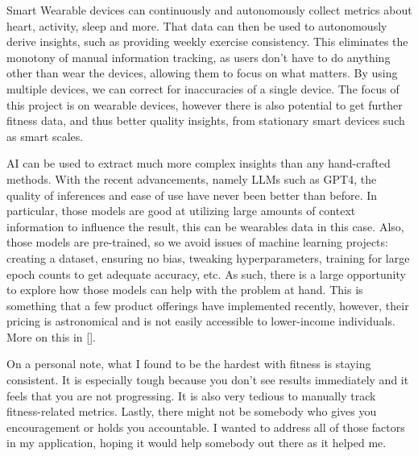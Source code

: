 \par Smart Wearable devices can continuously and autonomously collect metrics about heart, activity, 
sleep and more. That data can then be used to autonomously derive insights, such as providing weekly exercise consistency. 
This eliminates the monotony of manual information tracking, as users don't have to do anything other than wear the devices,
 allowing them to focus on what matters. By using multiple devices, we can correct for inaccuracies of a single device. 
 The focus of this project is on wearable devices, however there is also potential to get further fitness data, and thus better quality insights, from stationary smart devices such as smart scales.

\par AI can be used to extract much more complex insights than any hand-crafted methods. With the recent advancements,
 namely LLMs such as GPT4, the quality of inferences and ease of use have never been better than before. In particular,
 those models are good at utilizing large amounts of context information to influence the result, this can be wearables data in this case. Also, those models are pre-trained, so we avoid issues of machine learning projects: creating a dataset, ensuring no bias, tweaking hyperparameters, training for large epoch counts to get adequate accuracy, etc.  As such, there is a large opportunity to explore how those models can help with the problem at hand. This is something that a few product offerings 
 have implemented recently, however, their pricing is astronomical and is not easily accessible to lower-income individuals. More on this in [].


On a personal note, what I found to be the hardest with fitness is staying consistent. It is especially tough because you don't 
see results immediately and it feels that you are not progressing. It is also very tedious to manually track fitness-related metrics.
Lastly, there might not be somebody who gives you encouragement or holds you accountable. I wanted to address all of those factors in my application, hoping it would help somebody out there as it helped me.
